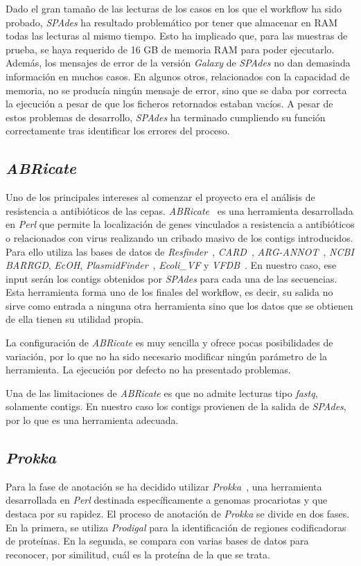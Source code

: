 Dado el gran tamaño de las lecturas de los casos en los que el workflow ha sido probado, \textit{SPAdes} ha resultado problemático por tener que almacenar en RAM todas las lecturas al mismo tiempo. Esto ha implicado que, para las muestras de prueba, se haya requerido de 16 GB de memoria RAM para poder ejecutarlo. Además, los mensajes de error de la versión \textit{Galaxy} de \textit{SPAdes} no dan demasiada información en muchos casos. En algunos otros, relacionados con la capacidad de memoria, no se producía ningún mensaje de error, sino que se daba por correcta la ejecución a pesar de que los ficheros retornados estaban vacíos. A pesar de estos problemas de desarrollo, \textit{SPAdes} ha terminado cumpliendo su función correctamente tras identificar los errores del proceso. 

\subsection{\itshape{ABRicate}}
Uno de los principales intereses al comenzar el proyecto era el análisis de resistencia a antibióticos de las cepas. \textit{ABRicate}~\cite{seemann_:mag_right:_2019} es una herramienta desarrollada en \textit{Perl} que permite la localización de genes vinculados a resistencia a antibióticos o relacionados con virus realizando un cribado masivo de los contigs introducidos. Para ello utiliza las bases de datos de \textit{Resfinder}~\cite{Resfinder}, \textit{CARD}~\cite{CARD}, \textit{ARG-ANNOT}~\cite{Gupta212}, \textit{NCBI} \textit{BARRGD}, \textit{EcOH}, \textit{PlasmidFinder}~\cite{Carattoli3895}, \textit{Ecoli\_VF} y \textit{VFDB}~\cite{VFDB}. En nuestro caso, ese input serán los contigs obtenidos por \textit{SPAdes} para cada una de las secuencias. Esta herramienta forma uno de los finales del workflow, es decir, su salida no sirve como entrada a ninguna otra herramienta sino que los datos que se obtienen de ella tienen su utilidad propia.

La configuración de \textit{ABRicate} es muy sencilla y ofrece pocas posibilidades de variación, por lo que no ha sido necesario modificar ningún parámetro de la herramienta. La ejecución por defecto no ha presentado problemas.

Una de las limitaciones de \textit{ABRicate} es que no admite lecturas tipo \textit{fastq}, solamente contigs. En nuestro caso los contigs provienen de la salida de \textit{SPAdes}, por lo que es una herramienta adecuada.

\subsection{\itshape{Prokka}}
Para la fase de anotación se ha decidido utilizar \textit{Prokka}~\cite{Seemann2014}, una herramienta desarrollada en \textit{Perl} destinada específicamente a genomas procariotas y que destaca por su rapidez. El proceso de anotación de \textit{Prokka} se divide en dos fases. En la primera, se utiliza \textit{Prodigal} para la identificación de regiones codificadoras de proteínas. En la segunda, se compara con varias bases de datos para reconocer, por similitud, cuál es la proteína de la que se trata.

